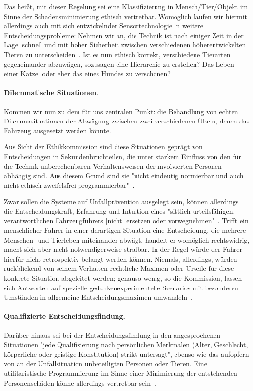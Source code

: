 \documentclass[twocolumn, german]{tum-article}
\begin{document}
Das heißt, mit dieser Regelung sei eine Klassifizierung in Mensch/Tier/Objekt im Sinne der Schadensminimierung ethisch vertretbar.
Womöglich laufen wir hiermit allerdings auch mit sich entwickelnder Sensortechnologie in weitere Entscheidungsprobleme:
Nehmen wir an, die Technik ist nach einiger Zeit in der Lage, schnell und mit hoher Sicherheit zwischen verschiedenen höherentwickelten Tieren zu unterscheiden~\cite[S. 551f.]{ethics-code}.
Ist es nun ethisch korrekt, verschiedene Tierarten gegeneinander abzuwägen, sozusagen eine Hierarchie zu erstellen? Das Leben einer Katze, oder eher das eines Hundes zu verschonen?

\paragraph{Dilemmatische Situationen.}
Kommen wir nun zu dem für uns zentralen Punkt: die Behandlung von echten Dilemmasituationen der Abwägung zwischen zwei verschiedenen Übeln, denen das Fahrzeug ausgesetzt werden könnte.

Aus Sicht der Ethikkommission sind diese Situationen geprägt von Entscheidungen in Sekundenbruchteilen, die unter starkem Einfluss von den für die Technik unberechenbaren Verhaltensweisen der involvierten Personen abhängig sind.
Aus diesem Grund sind sie "nicht eindeutig normierbar und auch nicht ethisch zweifelsfrei programmierbar"~\cite[S. 11]{ethik-komission}.

Zwar sollen die Systeme auf Unfallprävention ausgelegt sein, können allerdings die Entscheidungskraft, Erfahrung und Intuition eines "sittlich urteilsfähigen, verantwortlichen Fahrzeugführers [nicht] ersetzen oder vorwegnehmen"~\cite[S. 11]{ethik-komission}.
Trifft ein menschlicher Fahrer in einer derartigen Situation eine Entscheidung, die mehrere Menschen- und Tierleben miteinander abwägt, handelt er womöglich rechtswidrig, macht sich aber nicht notwendigerweise strafbar.
In der Regel würde der Fahrer hierfür nicht retrospektiv belangt werden können.
Niemals, allerdings, würden rückblickend von seinem Verhalten rechtliche Maximen oder Urteile für diese konkrete Situation abgeleitet werden;
genauso wenig, so die Kommission, lassen sich Antworten auf spezielle gedankenexperimentelle Szenarios mit besonderen Umständen in allgemeine Entscheidungsmaximen umwandeln~\cite[S. 11]{ethik-komission}.

\paragraph{Qualifizierte Entscheidungsfindung.}
Darüber hinaus sei bei der Entscheidungsfindung in den angesprochenen Situationen "jede Qualifizierung nach persönlichen Merkmalen (Alter, Geschlecht, körperliche oder geistige Konstitution) strikt untersagt", ebenso wie das aufopfern von an der Unfallsituation unbeteiligten Personen oder Tieren.
Eine utilitaristische Programmierung im Sinne einer Minimierung der entstehenden Personenschäden könne allerdings vertretbar sein~\cite[S. 11]{ethik-komission}.
\end{document}
